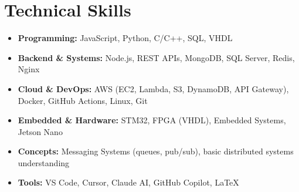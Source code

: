 \documentclass[a4paper,10.5pt]{article}
\begin{document}
\section{Technical Skills}

\begin{itemize}[nosep, leftmargin=1.5em, topsep=2pt]
  \item \textbf{Programming:} JavaScript, Python, C/C++, SQL, VHDL
  \item \textbf{Backend \& Systems:} Node.js, REST APIs, MongoDB, SQL Server, Redis, Nginx
  \item \textbf{Cloud \& DevOps:} AWS (EC2, Lambda, S3, DynamoDB, API Gateway), Docker, GitHub Actions, Linux, Git
  \item \textbf{Embedded \& Hardware:} STM32, FPGA (VHDL), Embedded Systems, Jetson Nano
  \item \textbf{Concepts:} Messaging Systems (queues, pub/sub), basic distributed systems understanding
  \item \textbf{Tools:} VS Code, Cursor, Claude AI, GitHub Copilot, LaTeX
\end{itemize}
\end{document}
